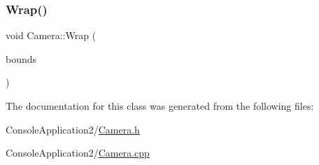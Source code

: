 \hypertarget{class_camera_ad2f98f35c9a25c335ce7c5e6beae1ff9}{}\label{class_camera_ad2f98f35c9a25c335ce7c5e6beae1ff9} 
\subsubsection{\texorpdfstring{Wrap()}{Wrap()}\hspace{0.1cm}{\footnotesize\ttfamily [2/2]}}
{\footnotesize\ttfamily void Camera\+::\+Wrap (\begin{DoxyParamCaption}\item[{sf\+::\+Float\+Rect \&}]{bounds }\end{DoxyParamCaption})}



The documentation for this class was generated from the following files\+:\begin{DoxyCompactItemize}
\item 
Console\+Application2/\hyperlink{_camera_8h}{Camera.\+h}\item 
Console\+Application2/\hyperlink{_camera_8cpp}{Camera.\+cpp}\end{DoxyCompactItemize}
